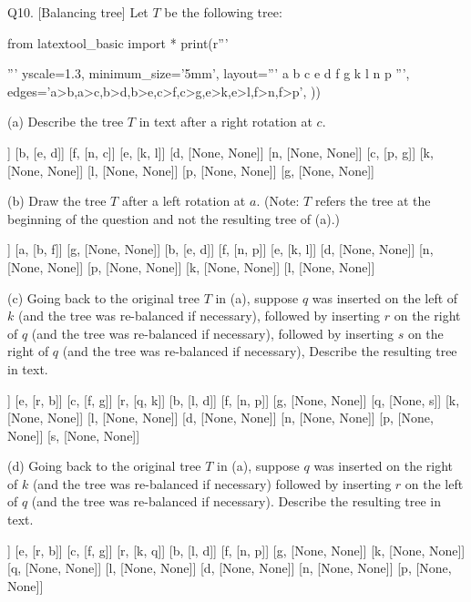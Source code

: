 \newpage
Q10. [Balancing tree]
Let $T$ be the following tree:
\begin{python}
from latextool_basic import *
print(r'''
\begin{center}
\end{center}
''' %
        yscale=1.3,
        minimum_size='5mm',
        layout='''
           a
         b   c  
        e d f g 
       k l n p 
        ''',
        edges='a>b,a>c,b>d,b>e,c>f,c>g,e>k,e>l,f>n,f>p',
        ))
\end{python}

(a) Describe the tree $T$ in text after a right rotation at $c$.
\\
\ANSWER
\begin{answercode}
[a, [b, f]]
[b, [e, d]]
[f, [n, c]]
[e, [k, l]]
[d, [None, None]]
[n, [None, None]]
[c, [p, g]]
[k, [None, None]]
[l, [None, None]]
[p, [None, None]]
[g, [None, None]]
\end{answercode}

(b) Draw the tree $T$ after a left rotation at  $a$.
(Note: $T$ refers the tree at the beginning
of the question and not the resulting tree of (a).)
\\
\ANSWER
\begin{answercode}
[c, [a, g]]
[a, [b, f]]
[g, [None, None]]
[b, [e, d]]
[f, [n, p]]
[e, [k, l]]
[d, [None, None]]
[n, [None, None]]
[p, [None, None]]
[k, [None, None]]
[l, [None, None]]
\end{answercode}

(c) Going back to the original tree $T$ in (a), suppose
$q$ was inserted on the left of $k$ (and the tree was re-balanced if necessary),
followed by
inserting $r$ on the right of $q$ (and the tree was re-balanced if necessary),
followed by
inserting $s$ on the right of $q$
(and the tree was re-balanced if necessary),
Describe the resulting tree in text.
\\
\ANSWER
\begin{answercode}
[a, [e, c]]
[e, [r, b]]
[c, [f, g]]
[r, [q, k]]
[b, [l, d]]
[f, [n, p]]
[g, [None, None]]
[q, [None, s]]
[k, [None, None]]
[l, [None, None]]
[d, [None, None]]
[n, [None, None]]
[p, [None, None]]
[s, [None, None]]
\end{answercode}

(d) Going back to the original tree $T$ in (a), suppose
$q$ was inserted on the right of $k$ (and the tree was re-balanced if necessary)
followed by inserting $r$ on the left of $q$ (and the tree was re-balanced if
necessary).
Describe the resulting tree in text.
\\
\ANSWER
\begin{answercode}
[a, [e, c]]
[e, [r, b]]
[c, [f, g]]
[r, [k, q]]
[b, [l, d]]
[f, [n, p]]
[g, [None, None]]
[k, [None, None]]
[q, [None, None]]
[l, [None, None]]
[d, [None, None]]
[n, [None, None]]
[p, [None, None]]
\end{answercode}




